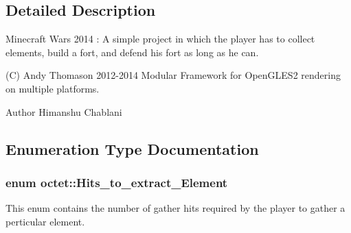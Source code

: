 \subsection{Detailed Description}
Minecraft Wars 2014 \+: A simple project in which the player has to collect elements, build a fort, and defend his fort as long as he can. 

(C) Andy Thomason 2012-\/2014 Modular Framework for Open\+G\+L\+E\+S2 rendering on multiple platforms. \begin{DoxyAuthor}{Author}
Himanshu Chablani 
\end{DoxyAuthor}


\subsection{Enumeration Type Documentation}
\hypertarget{namespaceoctet_ae8a703c3351a9f48aa7ad96fc57c55b4}{
\subsubsection[{Hits\+\_\+to\+\_\+extract\+\_\+\+Element}]{\setlength{\rightskip}{0pt plus 5cm}enum {\bf octet\+::\+Hits\+\_\+to\+\_\+extract\+\_\+\+Element}}}\label{namespaceoctet_ae8a703c3351a9f48aa7ad96fc57c55b4}


This enum contains the number of gather hits required by the player to gather a perticular element. 

